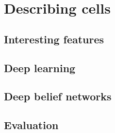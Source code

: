 
\chapter{Describing cells} %

\label{Chapter6} %




\section{Interesting features}

\section{Deep learning}

\section{Deep belief networks}

\section{Evaluation}

